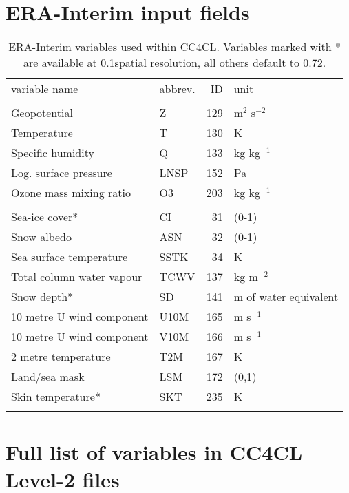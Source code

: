 \appendix

\section{ERA-Interim input fields}

\begin{table}[ht]
  \caption{ERA-Interim variables used within CC4CL. Variables marked with * are available at 0.1\textdegree spatial resolution, all others default to 0.72\textdegree.}
  \begin{tabular}{p{3.8cm}|l|r|p{1.5cm}}
    \tophline
    variable name & abbrev. & ID & unit \\
    \middlehline
    \multicolumn{4}{c}{profile variables} \\
    \middlehline
    Geopotential & Z & 129 & m$^2$ s$^{-2}$ \\
    Temperature  & T & 130 & K \\
    Specific humidity & Q & 133 & kg kg$^{-1}$ \\
    Log. surface pressure & LNSP & 152 & Pa \\
    Ozone mass mixing ratio & O3 & 203 & kg kg$^{-1}$ \\
    \middlehline
    \multicolumn{4}{c}{surface and single level variables} \\
    \middlehline
    Sea-ice cover* & CI & 31 & (0-1) \\
    Snow albedo & ASN & 32 & (0-1) \\
    Sea surface temperature & SSTK & 34 & K \\
    Total column water vapour & TCWV & 137 & kg m$^{-2}$ \\
    Snow depth* & SD & 141 & m of water equivalent \\
    10 metre U wind component & U10M & 165 & m s$^{-1}$ \\
    10 metre U wind component & V10M & 166 & m s$^{-1}$ \\
    2 metre temperature & T2M & 167 & K \\
    Land/sea mask & LSM & 172 & (0,1) \\
    Skin temperature* & SKT & 235 & K \\
    \bottomhline
  \end{tabular}
  \label{tab:ERA-Interim}
\end{table}

\section{Full list of variables in CC4CL Level-2 files}   

